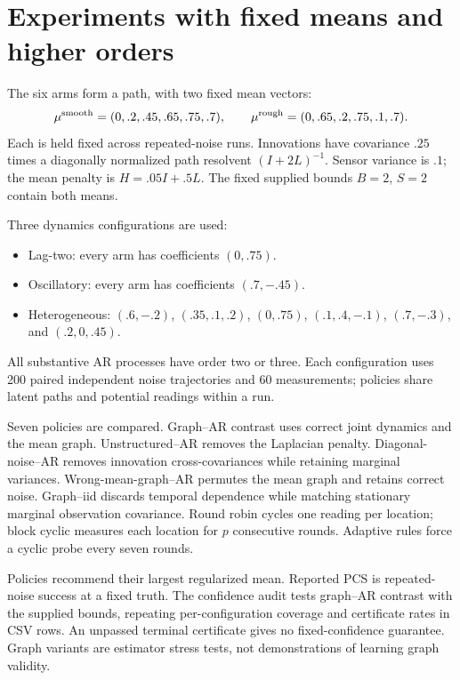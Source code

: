 \documentclass[11pt]{article}
\begin{document}
\section{Experiments with fixed means and higher orders}
The six arms form a path, with two fixed mean vectors:
\[
\mu^{\rm smooth}=(0,.2,.45,.65,.75,.7),\qquad
\mu^{\rm rough}=(0,.65,.2,.75,.1,.7).
\]
Each is held fixed across repeated-noise runs. Innovations have covariance $.25$ times a diagonally normalized path resolvent $(I+2L)^{-1}$. Sensor variance is $.1$; the mean penalty is $H=.05I+.5L$. The fixed supplied bounds $B=2$, $S=2$ contain both means.

Three dynamics configurations are used:
\begin{itemize}
\item Lag-two: every arm has coefficients $(0,.75)$.
\item Oscillatory: every arm has coefficients $(.7,-.45)$.
\item Heterogeneous: $(.6,-.2)$, $(.35,.1,.2)$, $(0,.75)$, $(.1,.4,-.1)$, $(.7,-.3)$, and $(.2,0,.45)$.
\end{itemize}
All substantive AR processes have order two or three. Each configuration uses 200 paired independent noise trajectories and 60 measurements; policies share latent paths and potential readings within a run.

Seven policies are compared. Graph--AR contrast uses correct joint dynamics and the mean graph. Unstructured--AR removes the Laplacian penalty. Diagonal-noise--AR removes innovation cross-covariances while retaining marginal variances. Wrong-mean-graph--AR permutes the mean graph and retains correct noise. Graph--iid discards temporal dependence while matching stationary marginal observation covariance. Round robin cycles one reading per location; block cyclic measures each location for $p$ consecutive rounds. Adaptive rules force a cyclic probe every seven rounds.

Policies recommend their largest regularized mean. Reported PCS is repeated-noise success at a fixed truth. The confidence audit tests graph--AR contrast with the supplied bounds, repeating per-configuration coverage and certificate rates in CSV rows. An unpassed terminal certificate gives no fixed-confidence guarantee. Graph variants are estimator stress tests, not demonstrations of learning graph validity.

\begin{table}[p]
\centering\scriptsize

\caption{Fixed-mean selection over 200 paired noise runs per configuration, six arms, and budget 60. Loss is opportunity loss; PCS is repeated-noise recommendation accuracy. Full CSVs include omitted graph and noise baselines, standard errors, paired comparisons, and confidence audits.}
\label{tab:results}
\end{table}
\end{document}
